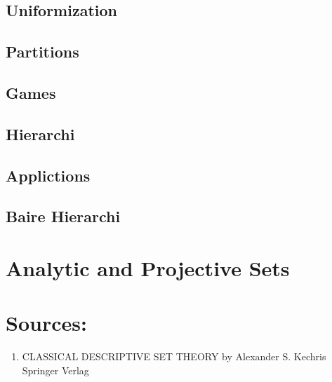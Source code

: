\documentclass[12pt]{scrartcl}
\renewcommand{\.}{\; . \;}
\begin{document}
\subsection{Uniformization}
\subsection{Partitions}
\subsection{Games}
\subsection{Hierarchi}
\subsection{Applictions}
\subsection{Baire Hierarchi}
\section{Analytic and Projective Sets}
\newpage
\section*{Sources:}
\begin{enumerate}
\item CLASSICAL DESCRIPTIVE SET THEORY by Alexander S. Kechris  Springer Verlag
\end{enumerate}
\end{document}
